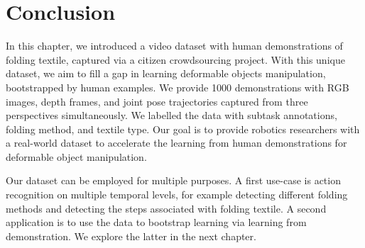 \documentclass[\home/main.tex]{subfiles}
\begin{document}
\newpage
\section{Conclusion}

In this chapter, we introduced a video dataset with human demonstrations of folding textile, captured via a citizen crowdsourcing project. With this unique dataset, we aim to fill a gap in learning deformable objects manipulation, bootstrapped by human examples. We provide \qty{1000}{} demonstrations with RGB images, depth frames, and joint pose trajectories captured from three perspectives simultaneously. We labelled the data with subtask annotations, folding method, and textile type. Our goal is to provide robotics researchers with a real-world dataset to accelerate the learning from human demonstrations for deformable object manipulation.

Our dataset can be employed for multiple purposes. A first use-case is action recognition on multiple temporal levels, for example detecting different folding methods and detecting the steps associated with folding textile. A second application is to use the data to bootstrap learning via learning from demonstration. We explore the latter in the next chapter.
\end{document}
